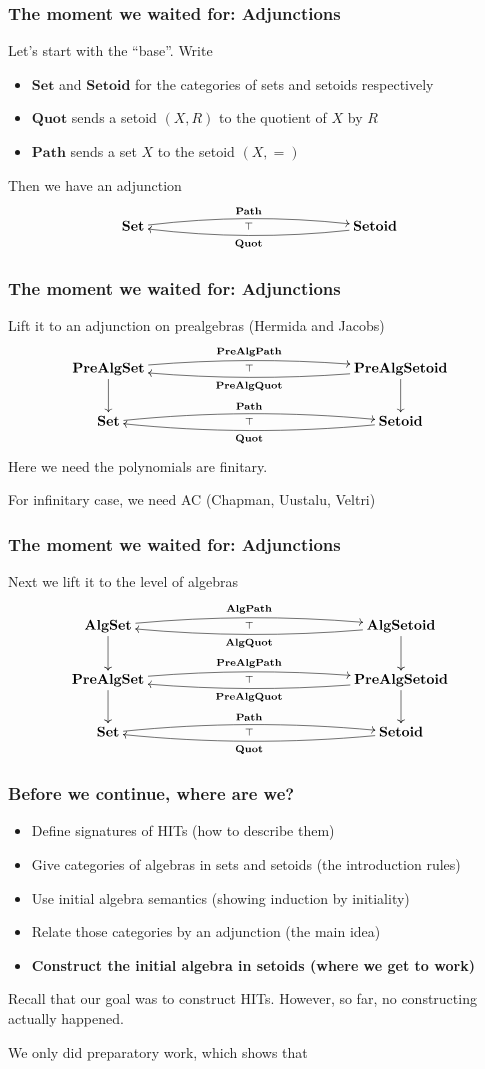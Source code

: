 \documentclass{beamer}
\newcommand{\sets}{\mathbf{Set}}
\newcommand{\setoids}{\mathbf{Setoid}}
\newcommand{\quotient}{\mathbf{Quot}}
\newcommand{\paths}{\mathbf{Path}}
\newcommand{\prealgsets}{\mathbf{PreAlgSet}}
\newcommand{\prealgsetoids}{\mathbf{PreAlgSetoid}}
\newcommand{\prealgquotient}{\mathbf{PreAlgQuot}}
\newcommand{\prealgpaths}{\mathbf{PreAlgPath}}
\newcommand{\algsets}{\mathbf{AlgSet}}
\newcommand{\algsetoids}{\mathbf{AlgSetoid}}
\newcommand{\algquotient}{\mathbf{AlgQuot}}
\newcommand{\algpaths}{\mathbf{AlgPath}}
\begin{document}
\begin{frame}
\frametitle{The moment we waited for: Adjunctions}
Let's start with the ``base''.
Write
\begin{itemize}
	\item $\sets$ and $\setoids$ for the categories of sets and setoids respectively
	\item $\quotient$ sends a setoid $(X,R)$ to the quotient of $X$ by $R$
	\item $\paths$ sends a set $X$ to the setoid $(X, =)$
\end{itemize}
Then we have an adjunction
\[
\xymatrix
{
	\sets \ar@/^/[rrrrr]_-{\top}^-{\paths} & & & & & \ar@/^/[lllll]^-{\quotient} \setoids
}
\]
\end{frame}

\begin{frame}
\frametitle{The moment we waited for: Adjunctions}
Lift it to an adjunction on prealgebras (Hermida and Jacobs)
\[
\xymatrix
{
	\prealgsets \ar@/^/[rrrrr]_-{\top}^-{\prealgpaths} \ar[d] & & & & & \ar@/^/[lllll]^-{\prealgquotient} \prealgsetoids \ar[d] \\
	\sets \ar@/^/[rrrrr]_-{\top}^-{\paths} & & & & & \ar@/^/[lllll]^-{\quotient} \setoids
}
\]
Here we need the polynomials are finitary.

For infinitary case, we need AC (Chapman, Uustalu, Veltri)
\end{frame}

\begin{frame}
\frametitle{The moment we waited for: Adjunctions}
Next we lift it to the level of algebras
\[
\xymatrix
{
	\algsets \ar@/^/[rrrrr]_-{\top}^-{\algpaths} \ar[d] & & & & & \ar@/^/[lllll]^-{\algquotient} \algsetoids \ar[d] \\
	\prealgsets \ar@/^/[rrrrr]_-{\top}^-{\prealgpaths} \ar[d] & & & & & \ar@/^/[lllll]^-{\prealgquotient} \prealgsetoids \ar[d] \\
	\sets \ar@/^/[rrrrr]_-{\top}^-{\paths} & & & & & \ar@/^/[lllll]^-{\quotient} \setoids
}
\]
\end{frame}

\begin{frame}
\frametitle{Before we continue, where are we?}
\begin{itemize}
	\item Define signatures of HITs (how to describe them)
	\item Give categories of algebras in sets and setoids (the introduction rules)
	\item Use initial algebra semantics (showing induction by initiality)
	\item Relate those categories by an adjunction (the main idea)
	\item \textbf{Construct the initial algebra in setoids (where we get to work)}
\end{itemize}

Recall that our goal was to construct HITs.
However, so far, no constructing actually happened.

We only did preparatory work, which shows that

\end{frame}
\end{document}
